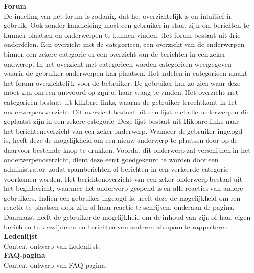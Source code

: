\documentclass[a4paper,12pt]{article}
\begin{document}
{\bfseries Forum}\\
De indeling van het forum is zodanig, dat het overzichtelijk is en intuitief in gebruik. Ook zonder handleiding moet een gebruiker in staat zijn om berichten te kunnen plaatsen en onderwerpen te kunnen vinden.
Het forum bestaat uit drie onderdelen. Een overzicht met de categorieen, een overzicht van de onderwerpen binnen een zekere categorie en een overzicht van de berichten in een zeker ondwerep. In het overzicht met categorieen worden categorieen weergegeven waarin de gebruiker onderwerpen kan plaatsen. Het indelen in categorieen maakt het forum overzichtelijk voor de bebruiker. De gebruiker kan zo zien waar deze moet zijn om een antwoord op zijn of haar vraag te vinden. Het overzicht met categorieen bestaat uit klikbare links, waarna de gebruiker terechtkomt in het onderwerpenoverzicht. Dit overzicht bestaat uit een lijst met alle onderwerpen die geplaatst zijn in een zekere categorie. Deze lijst bestaat uit klikbare links naar het berichtenoverzicht van een zeker onderwerp. Wanneer de gebruiker ingelogd is, heeft deze de mogelijkheid om een nieuw onderwerp te plaatsen door op de daarvoor bestemde knop te drukken. Voordat dit onderwerp zal verschijnen in het onderwerpenoverzicht, dient deze eerst goedgekeurd te worden door een administrator, zodat spamberichten of berichten in een verkeerde categorie voorkomen worden. Het berichtenoverzicht van een zeker onderwerp bestaat uit het beginbericht, waarmee het onderwerp geopend is en alle reacties van andere gebruikers. Indien een gebruiker ingelogd is, heeft deze de mogelijkheid om een reactie te plaatsen door zijn of haar reactie te schrijven, onderaan de pagina. Daarnaast heeft de gebruiker de mogelijkheid om de inhoud van zijn of haar eigen berichten te verwijderen en berichten van anderen als spam te rapporteren.\\


{\bfseries Ledenlijst}\\
Content ontwerp van Ledenlijst.\\


{\bfseries FAQ-pagina}\\
Content ontwerp van FAQ-pagina.\\
\end{document}

